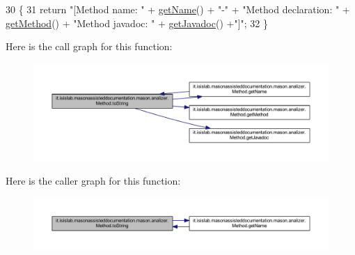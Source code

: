 \begin{DoxyCode}
30                             \{
31         \textcolor{keywordflow}{return} \textcolor{stringliteral}{"[Method name: "} + \hyperlink{classit_1_1isislab_1_1masonassisteddocumentation_1_1mason_1_1analizer_1_1_method_a87c28d457164a753322c0849ba2bc981}{getName}() + \textcolor{stringliteral}{"-"} + \textcolor{stringliteral}{"Method declaration: "} + 
      \hyperlink{classit_1_1isislab_1_1masonassisteddocumentation_1_1mason_1_1analizer_1_1_method_a8d2f7bfdb9e487a2564d8ebe46bc946e}{getMethod}() + \textcolor{stringliteral}{"Method javadoc: "} + \hyperlink{classit_1_1isislab_1_1masonassisteddocumentation_1_1mason_1_1analizer_1_1_method_a04c17c96931db2403fb5a5eca7d3837b}{getJavadoc}() +\textcolor{stringliteral}{"]"};
32     \}
\end{DoxyCode}


Here is the call graph for this function\-:\nopagebreak
\begin{figure}[H]
\begin{center}
\leavevmode
\includegraphics[width=350pt]{classit_1_1isislab_1_1masonassisteddocumentation_1_1mason_1_1analizer_1_1_method_ae68759230dfc5543fd98bfaba0c4d4a9_cgraph}
\end{center}
\end{figure}




Here is the caller graph for this function\-:\nopagebreak
\begin{figure}[H]
\begin{center}
\leavevmode
\includegraphics[width=350pt]{classit_1_1isislab_1_1masonassisteddocumentation_1_1mason_1_1analizer_1_1_method_ae68759230dfc5543fd98bfaba0c4d4a9_icgraph}
\end{center}
\end{figure}




